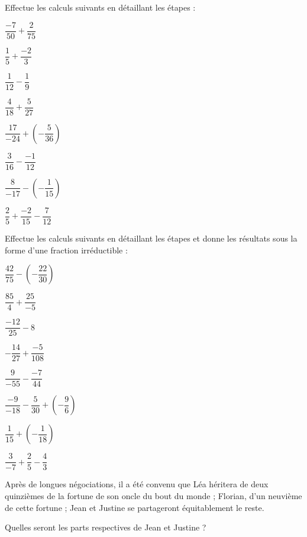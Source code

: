 \begin{exercice}

Effectue les calculs suivants en détaillant les étapes :

\begin{colenumerate}{2} 
\item $\dfrac{-7}{50} + \dfrac{2}{75}$
\item $\dfrac{1}{5} + \dfrac{-2}{3}$
\item $\dfrac{1}{12} - \dfrac{1}{9}$
\item $\dfrac{4}{18} + \dfrac{5}{27}$
\item $\dfrac{17}{-24} + \left(-\dfrac{5}{36}\right)$
\item $\dfrac{3}{16} - \dfrac{-1}{12}$
\item $\dfrac{8}{-17} - \left(-\dfrac{1}{15}\right)$
\item $\dfrac{2}{5} + \dfrac{-2}{15} - \dfrac{7}{12}$
\end{colenumerate} 
\end{exercice}

\begin{exercice}

Effectue les calculs suivants en détaillant les étapes et donne les résultats sous la forme d'une fraction irréductible :

\begin{colenumerate}{2} 
\item $\dfrac{42}{75} - \left(-\dfrac{22}{30}\right)$
\item $\dfrac{85}{4} + \dfrac{25}{-5}$
\item $\dfrac{-12}{25} -8$
\item $-\dfrac{14}{27} + \dfrac{-5}{108}$
\item $\dfrac{9}{-55} - \dfrac{-7}{44}$
\item $\dfrac{-9}{-18} - \dfrac{5}{30} + \left(-\dfrac{9}{6}\right)$
\item $\dfrac{1}{15} + \left(-\dfrac{1}{18}\right)$
\item $\dfrac{3}{-7} + \dfrac{2}{5}-\dfrac{4}{3}$
\end{colenumerate} 
 
\end{exercice}



\begin{exercice}[Héritage]
Après de longues négociations, il a été convenu que Léa héritera de deux quinzièmes de la fortune de son oncle du bout du monde ; Florian, d'un neuvième de cette fortune ; Jean et Justine se partageront équitablement le reste.

Quelles seront les parts respectives de Jean et Justine ?
\end{exercice}

